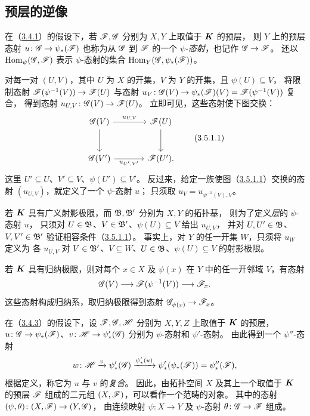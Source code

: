 \subsection{预层的逆像}\hypertarget{heading:0:3.5}{}

在（\hyperlink{para:0:3.4.1}{3.4.1}）的假设下，若 $\mathscr F,\mathscr G$ 分别为 $X,Y$ 上取值于 $\boldsymbol K$ 的预层，
则 $Y$ 上的预层态射 $u\colon\mathscr G\to\psi_*(\mathscr F)$ 也称为从 $\mathscr G$ 到 $\mathscr F$ 的一个
\emph{$\psi$-态射}，也记作 $\mathscr G\to\mathscr F$。
还以 $\operatorname{Hom}_\psi(\mathscr G,\mathscr F)$ 表示 $\psi$-态射的集合 $\operatorname{Hom}_Y(\mathscr G,\psi_*(\mathscr F))$。

对每一对 $(U,V)$，其中 $U$ 为 $X$ 的开集，$V$ 为 $Y$ 的开集，且 $\psi(U)\subseteq V$，
将限制态射 $\mathscr F(\psi^{-1}(V))\to\mathscr F(U)$ 与态射
$u_V\colon\mathscr G(V)\to\psi_*(\mathscr F)(V)=\mathscr F(\psi^{-1}(V))$ 复合，
得到态射 $u_{U,V}\colon\mathscr G(V)\to\mathscr F(U)$。
立即可见，这些态射使下图交换：
\begin{equation}
\begin{tikzcd}[column sep=large,row sep=large]
 \G(V) \arrow[r,"u_{U,V}"] \arrow[d] & \F(U) \arrow[d]\\
 \G(V') \arrow[r,"u_{U',V'}"'] & \F(U').
\end{tikzcd}
\tag{3.5.1.1}\label{eq:0:3.5.1.1}
\end{equation}
这里 $U'\subseteq U$、$V'\subseteq V$、$\psi(U')\subseteq V'$。
反过来，给定一族使图（\hyperref[eq:0:3.5.1.1]{3.5.1.1}）交换的态射 $(u_{U,V})$，就定义了一个 $\psi$-态射 $u$；
只须取 $u_V=u_{\psi^{-1}(V),V}$。

若 $\boldsymbol K$ 具有广义射影极限，而 $\mathfrak B,\mathfrak B'$ 分别为 $X,Y$ 的拓扑基，
则为了定义\emph{层}的 $\psi$-态射 $u$，
只须对 $U\in\mathfrak B$、$V\in\mathfrak B'$、$\psi(U)\subseteq V$ 给出 $u_{U,V}$，
并对 $U,U'\in\mathfrak B$、$V,V'\in\mathfrak B'$ 验证相容条件（\hyperref[eq:0:3.5.1.1]{3.5.1.1}）。
事实上，对 $Y$ 的任一开集 $W$，只须将 $u_W$ 定义为
各 $u_{U,V}$ 对 $V\in\mathfrak B'$、$V\subseteq W$、$U\in\mathfrak B$、$\psi(U)\subseteq V$ 的射影极限。

若 $\boldsymbol K$ 具有归纳极限，则对每个 $x\in X$ 及 $\psi(x)$ 在 $Y$ 中的任一开邻域 $V$，有态射
\[
 \mathscr G(V)\longrightarrow\mathscr F(\psi^{-1}(V))\longrightarrow\mathscr F_x.
\]
这些态射构成归纳系，取归纳极限得到态射 $\mathscr G_{\psi(x)}\to\mathscr F_x$。

在（\hyperlink{para:0:3.4.3}{3.4.3}）的假设下，设 $\mathscr F,\mathscr G,\mathscr H$ 分别为 $X,Y,Z$ 上取值于 $\boldsymbol K$ 的预层，
$u\colon\mathscr G\to\psi_*(\mathscr F)$、$v\colon\mathscr H\to\psi'_*(\mathscr G)$
分别为 $\psi$-态射和 $\psi'$-态射。
由此得到一个 $\psi''$-态射
\[
 w\colon\mathscr H\xrightarrow{v}\psi'_*(\mathscr G)
 \xrightarrow{\psi'_*(u)}\psi'_*(\psi_*(\mathscr F))=\psi''_*(\mathscr F),
\]
根据定义，称它为 $u$ 与 $v$ 的\emph{复合}。
因此，由拓扑空间 $X$ 及其上一个取值于 $\boldsymbol K$ 的预层 $\mathscr F$ 组成的二元组 $(X,\mathscr F)$，可以看作一个范畴的对象。
其中的态射 $(\psi,\theta)\colon(X,\mathscr F)\to(Y,\mathscr G)$，
由连续映射 $\psi\colon X\to Y$ 及 $\psi$-态射 $\theta\colon\mathscr G\to\mathscr F$ 组成。

